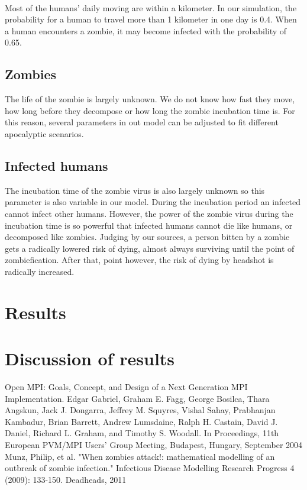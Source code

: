 \documentclass{report}
\begin{document}
\paragraph{}
Most of the humans' daily moving are within a kilometer. In our simulation, the probability for a human to travel more than 1 kilometer in one day is 0.4. When a human encounters a zombie, it may become infected with the probability of 0.65.

\subsection{Zombies}
The life of the zombie is largely unknown. We do not know how fast they move, how long before they decompose or how long the zombie incubation time is. For this reason, several parameters in out model can be adjusted to fit different apocalyptic scenarios.

\subsection{Infected humans}
The incubation time of the zombie virus is also largely unknown so this parameter is also variable in our model. During the incubation period an infected cannot infect other humans. However, the power of the zombie virus during the incubation time is so powerful that infected humans cannot die like humans, or decomposed like zombies. Judging by our sources\cite{deadheads}, a person bitten by a zombie gets a radically lowered risk of dying, almost always surviving until the point of zombiefication. After that, point however, the risk of dying by headshot is radically increased.




\section{Results}




\section{Discussion of results}

\begin{thebibliography}{99}
Open MPI: Goals, Concept, and Design of a Next Generation MPI Implementation. Edgar Gabriel, Graham E. Fagg, George Bosilca, Thara Angskun, Jack J. Dongarra, Jeffrey M. Squyres, Vishal Sahay, Prabhanjan Kambadur, Brian Barrett, Andrew Lumsdaine, Ralph H. Castain, David J. Daniel, Richard L. Graham, and Timothy S. Woodall. In Proceedings, 11th European PVM/MPI Users' Group Meeting, Budapest, Hungary, September 2004
Munz, Philip, et al. "When zombies attack!: mathematical modelling of an outbreak of zombie infection." Infectious Disease Modelling Research Progress 4 (2009): 133-150.
Deadheads, 2011
\end{thebibliography}
\end{document}
